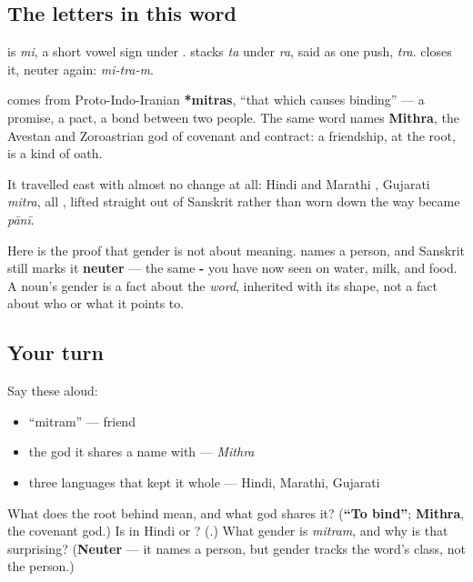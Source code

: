 \subsection*{The letters in this word}
\textbf{} is \emph{mi}, a short vowel sign under \textbf{}. \textbf{} stacks \textbf{} \emph{ta} under \textbf{} \emph{ra}, said as one push, \emph{tra}. \textbf{} closes it, neuter again: \emph{mi-tra-m}.

\begin{cousinweb}
\textbf{} comes from Proto-Indo-Iranian \textbf{*mitras}, \textquotedblleft{}that which causes binding\textquotedblright{} — a promise, a pact, a bond between two people. The same word names \textbf{Mithra}, the Avestan and Zoroastrian god of covenant and contract: a friendship, at the root, is a kind of oath.

It travelled east with almost no change at all: Hindi and Marathi \textbf{}, Gujarati \emph{mitra}, all , lifted straight out of Sanskrit rather than worn down the way \textbf{} became \emph{pānī}.
\end{cousinweb}

\begin{grammarlens}[title={Grammar Lens: a person, grammatically neuter}]
Here is the proof that gender is not about meaning. \textbf{} names a person, and Sanskrit still marks it \textbf{neuter} — the same \textbf{-} you have now seen on water, milk, and food. A noun's gender is a fact about the \emph{word}, inherited with its shape, not a fact about who or what it points to.
\end{grammarlens}

\subsection*{Your turn}
Say these aloud:

\begin{itemize}
\raggedright
  \item \textquotedblleft{}mitram\textquotedblright{} — friend
  \item the god it shares a name with — \emph{Mithra}
  \item three languages that kept it whole — Hindi, Marathi, Gujarati
\end{itemize}

\begin{tcolorbox}[breakable,colback=teal!4,colframe=teal!35!black,title={Before you move on}]
What does the root behind  mean, and what god shares it? (\textbf{\textquotedblleft{}To bind\textquotedblright{}}; \textbf{Mithra}, the covenant god.) Is  in Hindi  or ? (\textbf{}.) What gender is \emph{mitram}, and why is that surprising? (\textbf{Neuter} — it names a person, but gender tracks the word's class, not the person.)
\end{tcolorbox}
